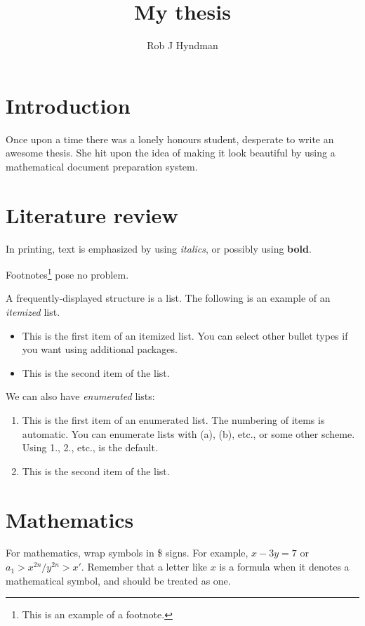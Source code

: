 \documentclass[a4paper,11pt]{article}
\begin{document}
  
\title{My thesis}
\author{Rob J Hyndman}
\maketitle

\section{Introduction}

Once upon a time there was a lonely honours student, desperate to write
an awesome thesis. She hit upon the idea of making it look beautiful by using a mathematical document
preparation system.

\section{Literature review}

In printing, text is emphasized by using \emph{italics}, or possibly using \textbf{bold}.

Footnotes\footnote{This is an example of a footnote.} pose no problem.

A frequently-displayed structure is a list. The following is an example of an \emph{itemized} list.
\begin{itemize}
   \item  This is the first item of an itemized list. You can select other bullet types if you want using additional packages.

   \item  This is the second item of the list.
\end{itemize}
We can also have \emph{enumerated} lists:
\begin{enumerate}
  \item This is the first item of an enumerated list. The numbering of items is automatic. You can enumerate lists with (a), (b), etc., or some other scheme. Using 1., 2., etc., is the default.

  \item This is the second item of the list. 
\end{enumerate}

\section{Mathematics}

For mathematics, wrap symbols in \$ signs. For example, $x-3y=7$
or $a_{1} > x^{2n} / y^{2n} > x' $.
Remember that a letter like $x$ is a formula when it denotes a
mathematical symbol, and should be treated as one.
\end{document}
